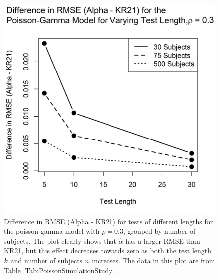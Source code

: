 \documentclass[12pt,epsfig]{article}
\newcommand{\changed}[1]{\textcolor{black}{#1}}
\newcommand{\numsubjects}{\changed{n}}%
\newcommand{\testlength}{\changed{k}}%
\begin{document}
\begin{figure}[ht] \centering
\includegraphics{PGPlot}
\caption{\color{black} Difference in RMSE (Alpha - KR21) for tests of different lengths for the poisson-gamma model with $\rho = 0.3$, grouped by number of subjects. The plot clearly shows that $\hat{\alpha}$ has a larger RMSE than KR21, but this effect decreases towards zero as both the test length $\testlength$ and number of subjects $\numsubjects$ increases. The data in this plot are from Table \ref{Tab:PoissonSimulationStudy}.}
\label{Fig:PGPlot}
\end{figure}
\end{document}
